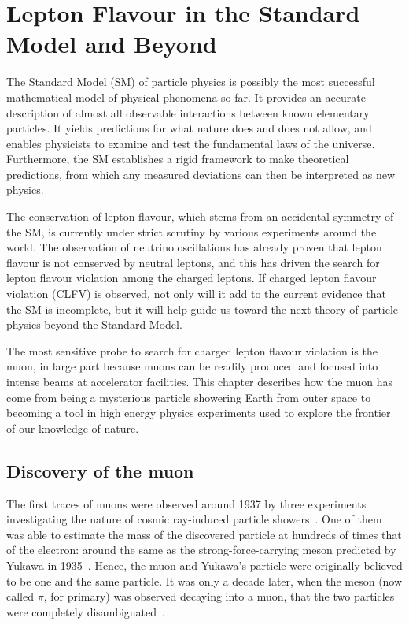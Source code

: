 \chapter{Lepton Flavour in the Standard Model and Beyond}\label{chapter1}

The Standard Model (SM) of particle physics is possibly the most successful
mathematical model of physical phenomena so far. It provides an accurate
description of almost all observable interactions between known elementary
particles. It yields predictions for what nature does and does not allow, and
enables physicists to examine and test the fundamental laws of the universe.
Furthermore, the SM establishes a rigid framework to make theoretical
predictions, from which any measured deviations can then be interpreted as new
physics.

The conservation of lepton flavour, which stems from an accidental symmetry of
the SM, is currently under strict scrutiny by various experiments around the
world. The observation of neutrino oscillations has already proven that lepton
flavour is not conserved by neutral leptons, and this has driven the search for
lepton flavour violation among the charged leptons. If charged lepton flavour
violation (CLFV) is observed, not only will it add to the current evidence that
the SM is incomplete, but it will help guide us toward the next theory of
particle physics beyond the Standard Model.

The most sensitive probe to search for charged lepton flavour violation
is the muon, in large part because muons can be readily produced and focused
into intense beams at accelerator facilities. This chapter describes how the
muon has come from being a mysterious particle showering Earth from outer space
to becoming a tool in high energy physics experiments used to explore the
frontier of our knowledge of nature.


\section{Discovery of the muon}
The first traces of muons were observed around 1937 by three experiments
investigating the nature of cosmic ray-induced particle
showers~\cite{PhysRev.51.884, PhysRev.52.1198, PhysRev.52.1003}. One of them was
able to estimate the mass of the discovered particle at hundreds of times that of the
electron: around the same as the strong-force-carrying meson predicted by Yukawa
in 1935~\cite{10.1143/PTPS.1.1}. Hence, the muon and Yukawa's particle were
originally believed to be one and the same particle. It was only a decade later,
when the meson (now called $\pi$, for primary) was observed decaying into a
muon, that the two particles were completely disambiguated~\cite{LATTES1947}.

